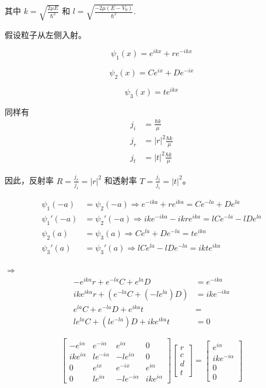 \documentclass[lang=cn,10pt]{elegantbook}
\begin{document}
\begin{enumerate}
	其中 $k = \sqrt{\frac{2\mu E}{\hbar^2}}$ 和 $l = \sqrt{\frac{-2\mu(E - V_0)}{\hbar^2}}$.
	
	假设粒子从左侧入射。
	
	\[
	\psi_1(x) = e^{ikx} + r e^{-ikx}
	\]
	
	\[
	\psi_2(x) = C e^{ix} + D e^{-ix}
	\]
	
	\[
	\psi_3(x) = t e^{ikx}
	\]
	
	同样有
	\begin{align*}
		j_i &= \frac{\hbar k}{\mu} \\
		j_r &= |r|^2 \frac{\hbar k}{\mu} \\
		j_t &= |t|^2 \frac{\hbar k}{\mu}
	\end{align*}
	
	因此，反射率 \( R = \frac{j_r}{j_i} = |r|^2 \) 和透射率 \( T = \frac{j_t}{j_i} = |t|^2 \)。
	
	\begin{align*}
		\psi_1(-a) &= \psi_2(-a) \Rightarrow e^{-ika} + r e^{ika} = C e^{-la} + D e^{la} \\
		\psi_1'(-a) &= \psi_2'(-a) \Rightarrow ike^{-ika} - ikr e^{ika} = l C e^{-la} - lDe^{la} \\
		\psi_2(a) &= \psi_3(a) \Rightarrow C e^{la} + D e^{-la} = te^{ika} \\
		\psi_3'(a) &= \psi_3'(a) \Rightarrow lC e^{la} - lDe^{-la} = ikte^{ika}
	\end{align*}
	
	$\Rightarrow$
	\begin{align*}
		-e^{ika} r + e^{-la} C + e^{la} D &= e^{-ika} \\
		ike^{ika} r + (e^{-la} C + (-le^{la}) D) &= ike^{-ika} \\
		e^{la} C + e^{-la} D + e^{ika} t &= \\
		le^{la} C + (le^{-la}) D + ike^{ika} t &= 0
	\end{align*}
	
	\[
	\begin{bmatrix}
		-e^{i\alpha} & e^{-i\alpha} & e^{i\alpha} & 0 \\
		ike^{i\alpha} & le^{-i\alpha} & -le^{i\alpha} & 0 \\
		0 & e^{ix} & e^{-ix} & e^{i\alpha} \\
		0 & le^{i\alpha} & -le^{-i\alpha} & ike^{i\alpha}
	\end{bmatrix}
	\begin{bmatrix}
		r \\
		c \\
		d \\
		t
	\end{bmatrix}
	=
	\begin{bmatrix}
		e^{i\alpha} \\
		ike^{-i\alpha} \\
		0 \\
		0
	\end{bmatrix}
	\]
	

\end{enumerate}
\end{document}
